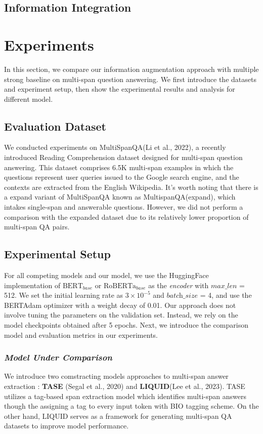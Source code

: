 \documentclass[a4paper,fleqn]{cas-dc}
\newcommand{\1}[1]{\mathds{1}\left[#1\right]}
\begin{document}
\subsection{Information Integration}
\label{sec:information_integration}




\section{Experiments}
In this section, we compare our information augmentation approach with multiple strong baseline on multi-span question answering. We first introduce the datasets and experiment setup, then show the experimental results and analysis for different model.

\subsection{Evaluation Dataset}
\label{sec:datasets}
	 We conducted experiments on MultiSpanQA(Li et al., 2022), a recently introduced Reading Comprehension dataset designed for multi-span question answering. This dataset comprises 6.5K multi-span examples in which the questions represent user queries issued to the Google search engine, and the contexts are extracted from the English Wikipedia. It's worth noting that there is a expand variant of MultiSpanQA known as MultispanQA(expand), which intakes single-span and answerable questions. However, we did not perform a comparison with the expanded dataset due to its relatively lower proportion of multi-span QA pairs.

\subsection{Experimental Setup}
	For all competing models and our model, we use the HuggingFace implementation of $\text{BERT}_{base}$ or $\text{RoBERTa}_{base}$ as the \textit{encoder} with $\textit{max\_len}$ = 512. We set the initial learning rate as $3 \times 10^{-5}$ and  $\textit{batch\_size}$ = 4, and use the BERTAdam optimizer with a weight decay of 0.01. Our approach does not involve tuning the parameters on the validation set. Instead, we rely on the model checkpoints obtained after 5 epochs. Next, we introduce the comparison model and evaluation metrics in our experiments.
	
	\subsubsection{\textit{Model Under Comparison}}
	\label{sec:baselines}
	We introduce two comstracting models approaches to multi-span answer extraction : \textbf{TASE} (Segal et al., 2020) and \textbf{LIQUID}(Lee et al., 2023). TASE utilizes a tag-based span extraction model which identifies multi-span answers though the assigning a tag to every input token with BIO tagging scheme. On the other hand, LIQUID serves as a framework for generating multi-span QA datasets to improve model performance.
	
\end{document}
